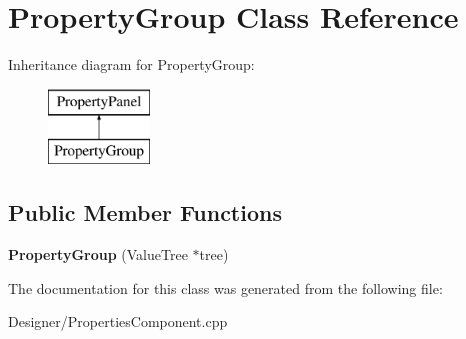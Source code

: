 \hypertarget{class_property_group}{\section{Property\-Group Class Reference}
\label{class_property_group}
}
Inheritance diagram for Property\-Group\-:\begin{figure}[H]
\begin{center}
\leavevmode
\includegraphics[height=2.000000cm]{class_property_group}
\end{center}
\end{figure}
\subsection*{Public Member Functions}
\begin{DoxyCompactItemize}
\item 
\hypertarget{class_property_group_a100e95cb8e880c2c622c0b77d1f1afe5}{{\bfseries Property\-Group} (Value\-Tree $\ast$tree)}\label{class_property_group_a100e95cb8e880c2c622c0b77d1f1afe5}

\end{DoxyCompactItemize}


The documentation for this class was generated from the following file\-:\begin{DoxyCompactItemize}
\item 
Designer/Properties\-Component.\-cpp\end{DoxyCompactItemize}

